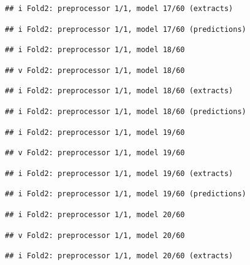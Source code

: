 \documentclass[
]{article}
\begin{document}
\begin{verbatim}
## i Fold2: preprocessor 1/1, model 17/60 (extracts)
\end{verbatim}

\begin{verbatim}
## i Fold2: preprocessor 1/1, model 17/60 (predictions)
\end{verbatim}

\begin{verbatim}
## i Fold2: preprocessor 1/1, model 18/60
\end{verbatim}

\begin{verbatim}
## v Fold2: preprocessor 1/1, model 18/60
\end{verbatim}

\begin{verbatim}
## i Fold2: preprocessor 1/1, model 18/60 (extracts)
\end{verbatim}

\begin{verbatim}
## i Fold2: preprocessor 1/1, model 18/60 (predictions)
\end{verbatim}

\begin{verbatim}
## i Fold2: preprocessor 1/1, model 19/60
\end{verbatim}

\begin{verbatim}
## v Fold2: preprocessor 1/1, model 19/60
\end{verbatim}

\begin{verbatim}
## i Fold2: preprocessor 1/1, model 19/60 (extracts)
\end{verbatim}

\begin{verbatim}
## i Fold2: preprocessor 1/1, model 19/60 (predictions)
\end{verbatim}

\begin{verbatim}
## i Fold2: preprocessor 1/1, model 20/60
\end{verbatim}

\begin{verbatim}
## v Fold2: preprocessor 1/1, model 20/60
\end{verbatim}

\begin{verbatim}
## i Fold2: preprocessor 1/1, model 20/60 (extracts)
\end{verbatim}
\end{document}
